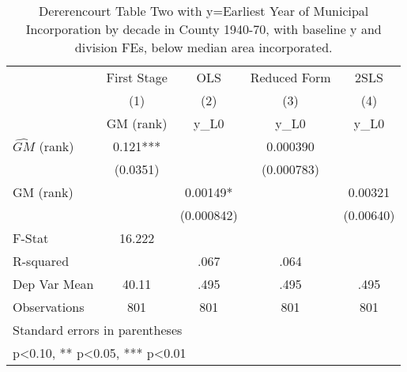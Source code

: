 \begin{table}[htbp]\centering
\def\sym#1{\ifmmode^{#1}\else\(^{#1}\)\fi}
\caption{Dererencourt Table Two with y=Earliest Year of Municipal Incorporation by decade in County 1940-70, with baseline y and division FEs, below median area incorporated.}
\begin{tabular}{l*{4}{c}}
\toprule
                    & First Stage   &         OLS   &Reduced Form   &        2SLS   \\
                    &\multicolumn{1}{c}{(1)}&\multicolumn{1}{c}{(2)}&\multicolumn{1}{c}{(3)}&\multicolumn{1}{c}{(4)}\\
                    &\multicolumn{1}{c}{GM  (rank)}&\multicolumn{1}{c}{y\_L0}&\multicolumn{1}{c}{y\_L0}&\multicolumn{1}{c}{y\_L0}\\
\midrule
$\hat{GM}$ (rank)   &       0.121***&               &    0.000390   &               \\
                    &    (0.0351)   &               &  (0.000783)   &               \\
\addlinespace
GM  (rank)          &               &     0.00149*  &               &     0.00321   \\
                    &               &  (0.000842)   &               &   (0.00640)   \\
\midrule
F-Stat              &      16.222   &               &               &               \\
R-squared           &               &        .067   &        .064   &               \\
Dep Var Mean        &       40.11   &        .495   &        .495   &        .495   \\
Observations        &         801   &         801   &         801   &         801   \\
\bottomrule
\multicolumn{5}{l}{\footnotesize Standard errors in parentheses}\\
\multicolumn{5}{l}{\footnotesize * p<0.10, ** p<0.05, *** p<0.01}\\
\end{tabular}
\end{table}
